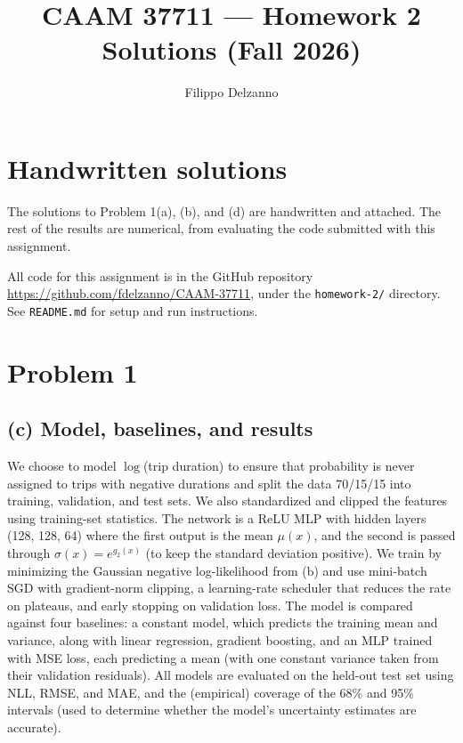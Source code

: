 \documentclass[11pt]{article}
\title{CAAM 37711 --- Homework 2 Solutions (Fall 2026)}
\author{Filippo Delzanno}
\begin{document}
\maketitle

\section*{Handwritten solutions}

The solutions to Problem 1(a), (b), and (d) are handwritten and attached. The rest of the results are numerical, from evaluating the code submitted with this assignment.


All code for this assignment is in the GitHub repository \url{https://github.com/fdelzanno/CAAM-37711}, under the \texttt{homework-2/} directory. See \texttt{README.md} for setup and run instructions.

\section*{Problem 1}

\subsection*{(c) Model, baselines, and results}

We choose to model $\log$(trip duration) to ensure that probability is never assigned to trips with negative durations and split the data 70/15/15 into training, validation, and test sets. We also standardized and clipped the features using training-set statistics. The network is a ReLU MLP with hidden layers (128, 128, 64) where the first output is the mean $\mu(x)$, and the second is passed through $\sigma(x) = e^{g_2(x)}$ (to keep the standard deviation positive). We train by minimizing the Gaussian negative log-likelihood from (b) and use mini-batch SGD with gradient-norm clipping, a learning-rate scheduler that reduces the rate on plateaus, and early stopping on validation loss. The model is compared against four baselines: a constant model, which predicts the training mean and variance, along with linear regression, gradient boosting, and an MLP trained with MSE loss, each predicting a mean (with one constant variance taken from their validation residuals). All models are evaluated on the held-out test set using NLL, RMSE, and MAE, and the (empirical) coverage of the 68\% and 95\% intervals (used to determine whether the model's uncertainty estimates are accurate).
\end{document}
